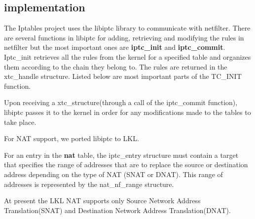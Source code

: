 {{\subsection{\project implementation}
\label{sub-sec:nat-lklnet}
The Iptables project uses the libiptc library to communicate with netfilter. There are several functions in libiptc for adding, retrieving and modifying the rules in netfilter but the most important ones are \textbf{iptc_init} and \textbf{iptc_commit}. 
Iptc_init retrieves all the rules from the kernel for a specified table and organizes them according to the chain they belong to. The rules are returned in the xtc_handle structure. Listed below are most important parts of the TC_INIT function.

\lstset{language=C, caption=TC_INIT}


Upon receiving a xtc_structure(through a call of the iptc_commit function), libiptc passes it to the kernel in order for any modifications made to the tables to take place.

For NAT support, we ported libiptc to LKL.

For an entry in the \textbf{nat} table, the iptc_entry structure must contain a target that specifies the range 
of addresses that are to replace the source or destination address depending on the type of NAT (SNAT or DNAT). 
This range of addresses is represented by the nat_nf_range structure.

\lstset{language=C, caption=struct nat_nf_range}


At present the LKL NAT supports only  Source Network Address Translation(SNAT) and  Destination Network Address Translation(DNAT).

}}
